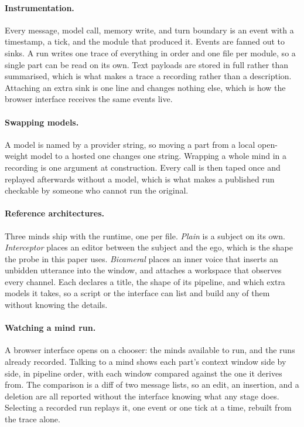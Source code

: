 \paragraph{Instrumentation.} Every message, model call, memory write, and turn
boundary is an event with a timestamp, a tick, and the module that produced it.
Events are fanned out to sinks. A run writes one trace of everything in order and
one file per module, so a single part can be read on its own. Text payloads are
stored in full rather than summarised, which is what makes a trace a recording
rather than a description. Attaching an extra sink is one line and changes
nothing else, which is how the browser interface receives the same events live.

\paragraph{Swapping models.} A model is named by a provider string, so moving a
part from a local open-weight model to a hosted one changes one string. Wrapping
a whole mind in a recording is one argument at construction. Every call is then
taped once and replayed afterwards without a model, which is what makes a
published run checkable by someone who cannot run the original.

\paragraph{Reference architectures.} Three minds ship with the runtime, one per
file. \emph{Plain} is a subject on its own. \emph{Interceptor} places an editor
between the subject and the ego, which is the shape the probe in this paper uses.
\emph{Bicameral} places an inner voice that inserts an unbidden utterance into
the window, and attaches a workspace that observes every channel. Each declares a
title, the shape of its pipeline, and which extra models it takes, so a script or
the interface can list and build any of them without knowing the details.

\paragraph{Watching a mind run.} A browser interface opens on a chooser: the
minds available to run, and the runs already recorded. Talking to a mind shows
each part's context window side by side, in pipeline order, with each window
compared against the one it derives from. The comparison is a diff of two message
lists, so an edit, an insertion, and a deletion are all reported without the
interface knowing what any stage does. Selecting a recorded run replays it, one
event or one tick at a time, rebuilt from the trace alone.
